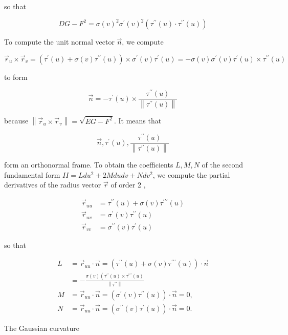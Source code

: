 \documentclass[10pt]{article}
\begin{document}
so that

$$
D G-F^{2}=\sigma(v)^{2} \sigma^{\prime}(v)^{2}\left(\tau^{\prime \prime}(u) \cdot \tau^{\prime \prime}(u)\right)
$$

To compute the unit normal vector $\vec{n}$, we compute

$$
\vec{r}_{u} \times \vec{r}_{v}=\left(\tau^{\prime}(u)+\sigma(v) \tau^{\prime \prime}(u)\right) \times \sigma^{\prime}(v) \tau^{\prime}(u)=-\sigma(v) \sigma^{\prime}(v) \tau^{\prime}(u) \times \tau^{\prime \prime}(u)
$$

to form

$$
\vec{n}=-\tau^{\prime}(u) \times \frac{\tau^{\prime \prime}(u)}{\left\|\tau^{\prime \prime}(u)\right\|}
$$

because $\left\|\vec{r}_{u} \times \vec{r}_{v}\right\|=\sqrt{E G-F^{2}}$. It means that

$$
\vec{n}, \tau^{\prime}(u), \frac{\tau^{\prime \prime}(u)}{\left\|\tau^{\prime \prime}(u)\right\|}
$$

form an orthonormal frame. To obtain the coefficients $L, M, N$ of the second fundamental form $I I=L d u^{2}+2 M d u d v+N d v^{2}$, we compute the partial derivatives of the radius vector $\vec{r}$ of order 2 ,

$$
\begin{aligned}
\vec{r}_{u u} & =\tau^{\prime \prime}(u)+\sigma(v) \tau^{\prime \prime \prime}(u) \\
\vec{r}_{u v} & =\sigma^{\prime}(v) \tau^{\prime \prime}(u) \\
\vec{r}_{v v} & =\sigma^{\prime \prime}(v) \tau^{\prime}(u)
\end{aligned}
$$

so that

$$
\begin{aligned}
L & =\vec{r}_{u u} \cdot \vec{n}=\left(\tau^{\prime \prime}(u)+\sigma(v) \tau^{\prime \prime \prime}(u)\right) \cdot \vec{n} \\
& =-\frac{\sigma(v)\left(\tau^{\prime \prime}(u) \times \tau^{\prime \prime \prime}(u)\right.}{\left\|\tau^{\prime \prime}\right\|} \\
M & =\vec{r}_{u u} \cdot \vec{n}=\left(\sigma^{\prime}(v) \tau^{\prime \prime}(u)\right) \cdot \vec{n}=0, \\
N & =\vec{r}_{u u} \cdot \vec{n}=\left(\sigma^{\prime \prime}(v) \tau^{\prime}(u)\right) \cdot \vec{n}=0 .
\end{aligned}
$$

The Gaussian curvature
\end{document}
